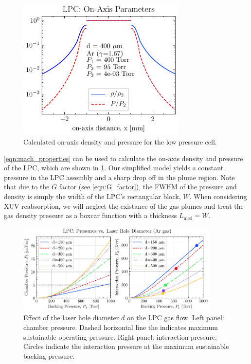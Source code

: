 \begin{figure}
	\centering
	\includegraphics[width=0.75\textwidth]{figures/chap3/LPC_on_axis.pdf}
	\caption{Calculated on-axis density and pressure for the low pressure cell.}
	\label{fig:LPC_on_axis}
\end{figure}

\cref{eqn:mach_properties} can be used to calculate the on-axis density and pressure of the LPC, which are shown in \cref{fig:LPC_on_axis}. Our simplified model yields a constant pressure in the LPC assembly and a sharp drop off in the plume region. Note that due to the $G$ factor (see \cref{eqn:G_factor}), the FWHM of the pressure and density is simply the width of the LPC's rectangular block, $W$. When considering XUV reabsorption, we will neglect the existance of the gas plumes and treat the gas density pressure as a boxcar function with a thickness ${L_{\textrm{med}}=W}$.

\begin{figure}
	\centering
	\includegraphics[width=0.9\textwidth]{figures/chap3/LPC_pressure_vs_diameter.pdf}
	\caption{Effect of the laser hole diameter $d$ on the LPC gas flow. Left panel: chamber pressure. Dashed horizontal line the indicates maximum sustainable operating pressure. Right panel: interaction pressure. Circles indicate the interaction pressure at the maximum sustainable backing pressure.}
	\label{fig:LPC_pressure_vs_diameter}
\end{figure}

